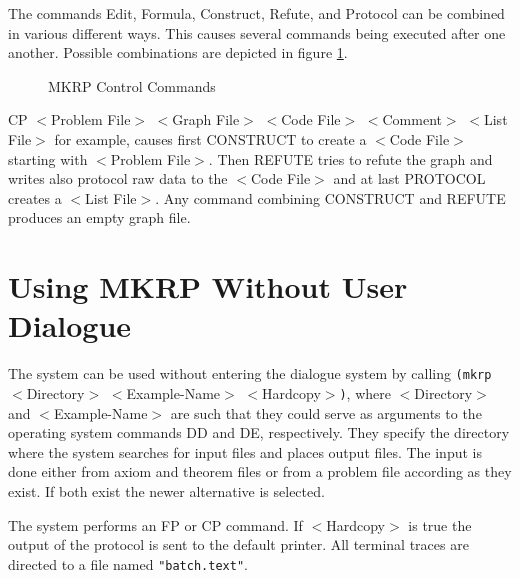 The commands Edit, Formula, Construct, Refute, and Protocol can be 
combined in various different ways. 
This causes several commands being executed after one another. 
Possible combinations are depicted in figure \ref{MKRPControlCommands}.
\begin{figure}[ht]
\caption{MKRP Control Commands}
\label{MKRPControlCommands}
\begin{center}
\end{center}
\end{figure}

CP $<$Problem File$>$ $<$Graph File$>$ $<$Code File$>$
                               $<$Comment$>$ $<$List File$>$ for example, 
causes first CONSTRUCT to create a $<$Code File$>$ starting 
with $<$Problem File$>$. Then REFUTE tries to refute the graph and writes also 
protocol raw data to the $<$Code File$>$  and at last
PROTOCOL creates a $<$List File$>$. Any command combining CONSTRUCT and REFUTE
produces an empty graph file.
\section{Using MKRP Without User Dialogue}
\label{UsingmkrpWithoutUserDialogue}

The system can be used without entering the dialogue system by calling 
{\tt (mkrp} $<$Directory$>$ $<$Example-Name$>$ $<$Hardcopy$>${\tt )}, where 
$<$Directory$>$ and $<$Example-Name$>$  are such that they 
could serve as arguments to the 
operating system commands DD and DE, respectively. They specify the directory where the 
system searches for input files and places output files. The input is done either 
from axiom and theorem files or from a problem file according as they exist.
If both exist the newer alternative is selected.

The system performs an FP or CP command. If $<$Hardcopy$>$ is true the output of the 
protocol is sent to the default printer. All terminal traces are
directed to a file named {\tt "batch.text"}.
